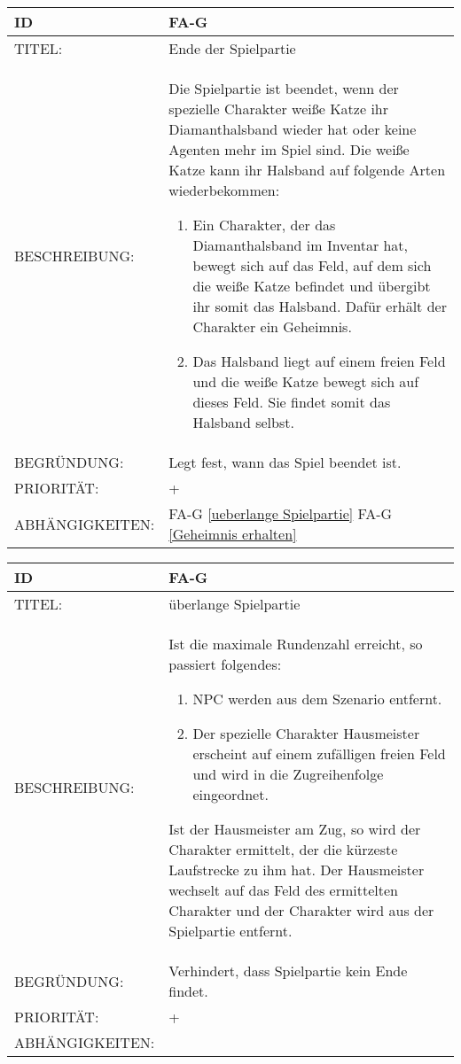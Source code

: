 \begin{tabularx}{16cm}{l|X}
	{table}\label{Ende der Spielpartie}
	\textbf{ID} & \textbf{FA-G \arabic{table}} \\
	\hline
	TITEL: & Ende der Spielpartie \\
	\hline
	BESCHREIBUNG: & Die Spielpartie ist beendet, wenn der spezielle Charakter weiße Katze ihr Diamanthalsband wieder hat oder keine Agenten mehr im Spiel sind. Die weiße Katze kann ihr Halsband auf folgende Arten wiederbekommen:
	\begin{enumerate}
		\item Ein Charakter, der das Diamanthalsband im Inventar hat, bewegt sich auf das Feld, auf dem sich die weiße Katze befindet und übergibt ihr somit das Halsband. Dafür erhält der Charakter ein Geheimnis.
		\item Das Halsband liegt auf einem freien Feld und die weiße Katze bewegt sich auf dieses Feld. Sie findet somit das Halsband selbst.
	\end{enumerate}\\
	\hline
	BEGRÜNDUNG: & Legt fest, wann das Spiel beendet ist. \\
	\hline
	PRIORITÄT: & +\\
	\hline
	ABHÄNGIGKEITEN: & FA-G \ref{ueberlange Spielpartie} FA-G \ref{Geheimnis erhalten} \\
\end{tabularx}

\begin{tabularx}{16cm}{l|X}
	{table}\label{ueberlange Spielpartie}
	\textbf{ID} & \textbf{FA-G \arabic{table}} \\
	\hline
	TITEL: & überlange Spielpartie \\
	\hline
	BESCHREIBUNG: & Ist die maximale Rundenzahl erreicht, so passiert folgendes:
	\begin{enumerate}
		\item NPC werden aus dem Szenario entfernt.
		\item Der spezielle Charakter Hausmeister erscheint auf einem zufälligen freien Feld und wird in die Zugreihenfolge eingeordnet.
	\end{enumerate}
	Ist der Hausmeister am Zug, so wird der Charakter ermittelt, der die kürzeste Laufstrecke zu ihm hat. Der Hausmeister wechselt auf das Feld des ermittelten Charakter und der Charakter wird aus der Spielpartie entfernt.\\
	\hline
	BEGRÜNDUNG: & Verhindert, dass Spielpartie kein Ende findet. \\
	\hline
	PRIORITÄT: & +\\
	\hline
	ABHÄNGIGKEITEN: &  \\
\end{tabularx}

